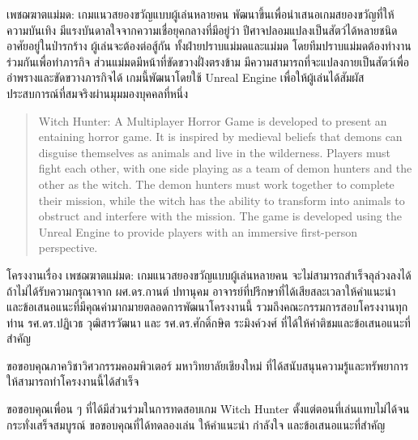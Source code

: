 \maketitle
\makesignature

\ifproject
\begin{abstractTH}
เพชฌฆาตแม่มด: เกมแนวสยองขวัญแบบผู้เล่นหลายคน พัฒนาขึ้นเพื่อนำเสนอเกมสยองขวัญที่ให้ความบันเทิง มีแรงบันดาลใจจากความเชื่อยุคกลางที่มีอยู่ว่า ปีศาจปลอมแปลงเป็นสัตว์ได้หลายชนิด อาศัยอยู่ในป่ารกร้าง ผู้เล่นจะต้องต่อสู้กัน ทั้งฝ่ายปราบแม่มดและแม่มด โดยทีมปราบแม่มดต้องทำงานร่วมกันเพื่อทำภารกิจ ส่วนแม่มดมีหน้าที่ขัดขวางฝั่งตรงข้าม มีความสามารถที่จะแปลงกายเป็นสัตว์เพื่ออำพรางและขัดขวางภารกิจได้ เกมนี้พัฒนาโดยใช้ Unreal Engine เพื่อให้ผู้เล่นได้สัมผัสประสบการณ์ที่สมจริงผ่านมุมมองบุคคลที่หนึ่ง
\end{abstractTH}

\begin{abstract}
Witch Hunter: A Multiplayer Horror Game is developed to present an entaining horror game. It is inspired by medieval beliefs that demons can disguise themselves as animals and live in the wilderness. Players must fight each other, with one side playing as a team of demon hunters and the other as the witch. The demon hunters must work together to complete their mission, while the witch has the ability to transform into animals to obstruct and interfere with the mission. The game is developed using the Unreal Engine to provide players with an immersive first-person perspective.
\end{abstract}
\iffalse
\begin{dedication}
This document is dedicated to all Chiang Mai University students.

Dedication page is optional.
\end{dedication}
\fi %

\begin{acknowledgments}
โครงงานเรื่อง เพชฌฆาตแม่มด: เกมแนวสยองขวัญแบบผู้เล่นหลายคน จะไม่สามารถสำเร็จลุล่วงลงได้ ถ้าไม่ได้รับความกรุณาจาก ผศ.ดร.กานต์ ปทานุคม
อาจารย์ที่ปรึกษาที่ได้เสียสละเวลาให้คำแนะนำ และข้อเสนอแนะที่มีคุณค่ามากมายตลอดการพัฒนาโครงงานนี้ รวมถึงคณะกรรมการสอบโครงงานทุกท่าน รศ.ดร.ปฏิเวธ วุฒิสารวัฒนา
และ รศ.ดร.ศักดิ์กษิต ระมิงค์วงศ์​ ที่ได้ให้คำติชมและข้อเสนอแนะที่สำคัญ

ขอขอบคุณภาควิชาวิศวกรรมคอมพิวเตอร์ มหาวิทยาลัยเชียงใหม่ ที่ได้สนับสนุนความรู้และทรัพยาการให้สามารถทำโครงงานนี้ได้สำเร็จ

ขอขอบคุณเพื่อน ๆ ที่ได้มีส่วนร่วมในการทดสอบเกม Witch Hunter ตั้งแต่ตอนที่เล่นแทบไม่ได้จนกระทั่งเสร็จสมบูรณ์ ขอขอบคุณที่ได้ทดลองเล่น ให้คำแนะนำ กำลังใจ และข้อเสนอแนะที่สำคัญ

\end{acknowledgments}%
\fi %

\contentspage

\ifproject
\figurelistpage

\tablelistpage
\fi %



